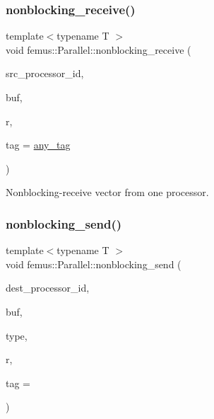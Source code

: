 \subsubsection{\texorpdfstring{nonblocking\+\_\+receive()}{nonblocking\_receive()}\hspace{0.1cm}{\footnotesize\ttfamily [2/2]}}
{\footnotesize\ttfamily template$<$typename T $>$ \\
void femus\+::\+Parallel\+::nonblocking\+\_\+receive (\begin{DoxyParamCaption}\item[{const int}]{src\+\_\+processor\+\_\+id,  }\item[{std\+::vector$<$ T $>$ \&}]{buf,  }\item[{\mbox{\hyperlink{structfemus_1_1_parallel_1_1request}{request}} \&}]{r,  }\item[{const int}]{tag = {\ttfamily \mbox{\hyperlink{namespacefemus_1_1_parallel_a928996065f46cb52e89e132cdcb30328}{any\+\_\+tag}}} }\end{DoxyParamCaption})\hspace{0.3cm}{\ttfamily [inline]}}

Nonblocking-\/receive vector from one processor. \mbox{\label{namespacefemus_1_1_parallel_a828c554bd96aecbb61a9da71e2f2f73b}} 
\subsubsection{\texorpdfstring{nonblocking\+\_\+send()}{nonblocking\_send()}\hspace{0.1cm}{\footnotesize\ttfamily [1/2]}}
{\footnotesize\ttfamily template$<$typename T $>$ \\
void femus\+::\+Parallel\+::nonblocking\+\_\+send (\begin{DoxyParamCaption}\item[{const unsigned int}]{dest\+\_\+processor\+\_\+id,  }\item[{std\+::vector$<$ T $>$ \&}]{buf,  }\item[{const \mbox{\hyperlink{classfemus_1_1_parallel_1_1_data_type}{Data\+Type}} \&}]{type,  }\item[{\mbox{\hyperlink{structfemus_1_1_parallel_1_1request}{request}} \&}]{r,  }\item[{const int}]{tag = {} }\end{DoxyParamCaption})\hspace{0.3cm}{\ttfamily [inline]}}


